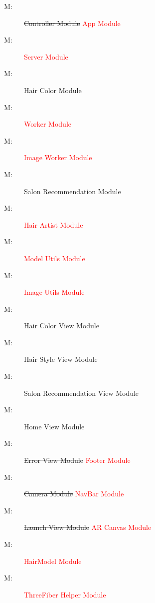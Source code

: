 \documentclass[12pt, titlepage]{article}
\newcounter{mnum}
\newcommand{\mthemnum}{M\themnum}
\begin{document}
\begin{description}
\item [ \mthemnum \label{mHH}:] \sout{Controller Module} \textcolor{red}{App Module}
\item [ \mthemnum \label{mHH}:] \textcolor{red}{Server Module}
\item [ \mthemnum \label{mHH}:] Hair Color Module
\item [ \mthemnum \label{mHH}:] \textcolor{red}{Worker Module}
\item [ \mthemnum \label{mHH}:] \textcolor{red}{Image Worker Module}
\item [ \mthemnum \label{mHH}:] Salon Recommendation Module
\item [ \mthemnum \label{mHH}:] \textcolor{red}{Hair Artist Module}
\item [ \mthemnum \label{mHH}:] \textcolor{red}{Model Utils Module}
\item [ \mthemnum \label{mHH}:] \textcolor{red}{Image Utils Module}
\item [ \mthemnum \label{mHH}:] Hair Color View Module
\item [ \mthemnum \label{mHH}:] Hair Style View Module
\item [ \mthemnum \label{mHH}:] Salon Recommendation View Module
\item [ \mthemnum \label{mHH}:] Home View Module
\item [ \mthemnum \label{mHH}:] \sout{Error View Module} \textcolor{red}{Footer Module}
\item [ \mthemnum \label{mHH}:] \sout{Camera Module} \textcolor{red}{NavBar Module}
\item [ \mthemnum \label{mHH}:] \sout{Launch View Module} \textcolor{red}{AR Canvas Module}
\item [ \mthemnum \label{mHH}:] \textcolor{red}{HairModel Module}
\item [ \mthemnum \label{mHH}:] \textcolor{red}{ThreeFiber Helper Module}
\end{description}
\end{document}

